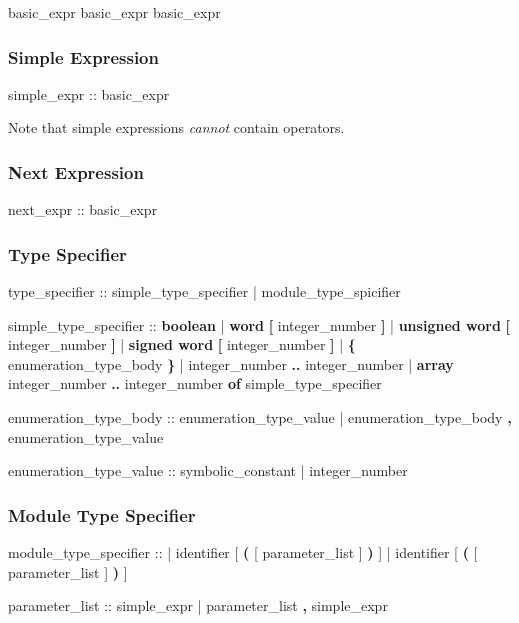 \begin{Grammar}
basic_expr  basic_expr \operator{:} basic_expr
\end{Grammar}

\subsubsection{Simple Expression}
\begin{Grammar}
simple_expr :: basic_expr
\end{Grammar}

Note that simple expressions \emph{cannot} contain  operators.


\subsubsection{Next Expression}
\begin{Grammar}
next_expr :: basic_expr
\end{Grammar}


\subsubsection{Type Specifier}
\begin{Grammar}
type_specifier ::
        simple_type_specifier
      | module_type_spicifier

simple_type_specifier :: 
        \textbf{boolean}
      | \textbf{word} \textbf{[} integer_number \textbf{]} 
      | \textbf{unsigned word} \textbf{[} integer_number \textbf{]} 
      | \textbf{signed word} \textbf{[} integer_number \textbf{]} 
      | \textbf{\{} enumeration_type_body \textbf{\}}
      | integer_number \textbf{..} integer_number
      | \textbf{array} integer_number \textbf{..} integer_number
                 \textbf{of} simple_type_specifier

enumeration_type_body ::
        enumeration_type_value
      | enumeration_type_body \textbf{,} enumeration_type_value

enumeration_type_value ::
        symbolic_constant
      | integer_number
\end{Grammar}


\subsubsection{Module Type Specifier}
\begin{Grammar}
module_type_specifier ::     
      | identifier [ \textbf{(} [ parameter_list ] \textbf{)} ]
      |  identifier [ \textbf{(} [ parameter_list ] \textbf{)} ]

parameter_list ::
        simple_expr
      | parameter_list \textbf{,} simple_expr
\end{Grammar}


